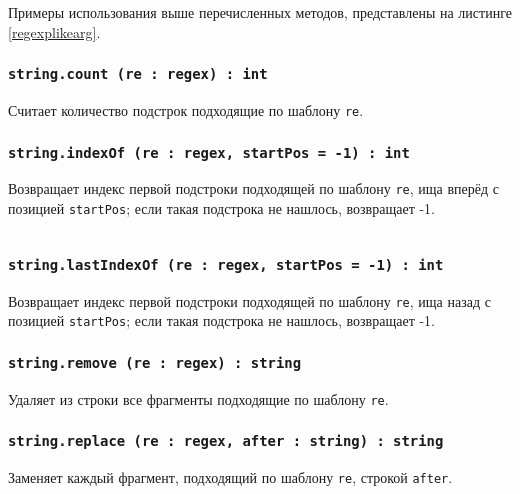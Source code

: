 Примеры использования выше перечисленных методов, представлены на листинге \ref{regexplikearg}.

\subsubsection{\texttt{string.count (re : regex) : int}}

Считает количество подстрок подходящие по шаблону \texttt{re}.

\subsubsection{\texttt{string.indexOf (re : regex, startPos = -1) : int}}

Возвращает индекс первой подстроки подходящей по шаблону \texttt{re}, ища вперёд с позицией \texttt{startPos}; если такая подстрока не нашлось, возвращает -1.

\begin{sourcecode}
	\label{regexplikearg}
    \inputminted[linenos]{icl}{../sources/regexplikearg.icL}
\end{sourcecode}

\subsubsection{\texttt{string.lastIndexOf (re : regex, startPos = -1) : int}}

Возвращает индекс первой подстроки подходящей по шаблону \texttt{re}, ища назад с позицией \texttt{startPos}; если такая подстрока не нашлось, возвращает -1.

\subsubsection{\texttt{string.remove (re : regex) : string}}

Удаляет из строки все фрагменты подходящие по шаблону \texttt{re}.

\subsubsection{\texttt{string.replace (re : regex, after : string) : string}}

Заменяет каждый фрагмент, подходящий по шаблону \texttt{re}, строкой \texttt{after}.

